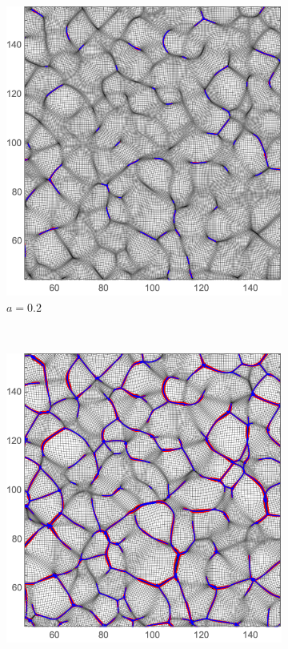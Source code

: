 \documentclass[a4paper, 11pt]{article}
\begin{document}
\begin{figure}
\centering
\begin{subfigure}[b]{0.49\textwidth}
\includegraphics[width=\textwidth]{Evolution_020}
\caption{$a=0.2$}
\end{subfigure}~
\begin{subfigure}[b]{0.49\textwidth}
\includegraphics[width=\textwidth]{Evolution_040}

\end{subfigure}
\end{figure}
\end{document}
